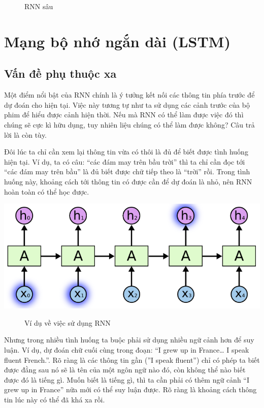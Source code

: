 \begin{itemize}
\begin{center}
\begin{figure}[htp]
\begin{center}
    \end{center}
    \caption{RNN sâu}
    \end{figure}
    \end{center}
\end{itemize}


\section{Mạng bộ nhớ ngắn dài (LSTM)}
\subsection{Vấn đề phụ thuộc xa}
Một điểm nổi bật của RNN chính là ý tưởng kết nối các thông tin phía trước để dự đoán cho hiện tại. Việc này tương tự như ta sử dụng các cảnh trước của bộ phim để hiểu được cảnh hiện thời. Nếu mà RNN có thể làm được việc đó thì chúng sẽ cực kì hữu dụng, tuy nhiên liệu chúng có thể làm được không? Câu trả lời là còn tùy.\par
Đôi lúc ta chỉ cần xem lại thông tin vừa có thôi là đủ để biết được tình huống hiện tại. Ví dụ, ta có câu: “các đám may trên bầu trời” thì ta chỉ cần đọc tới “các đám may trên bầu” là đủ biết được chữ tiếp theo là “trời” rồi. Trong tình huống này, khoảng cách tới thông tin có được cần để dự đoán là nhỏ, nên RNN hoàn toàn có thể học được.
\begin{center}
    \includegraphics[scale=.3]{image/chapter6/ptx1.png}
    \begin{figure}[htp]
    \begin{center}
     
    \end{center}
    \caption{Ví dụ về việc sử dụng RNN}
    \end{figure}
\end{center}
Nhưng trong nhiều tình huống ta buộc phải sử dụng nhiều ngữ cảnh hơn để suy luận. Ví dụ, dự đoán chữ cuối cùng trong đoạn: “I grew up in France… I speak fluent French.”. Rõ ràng là các thông tin gần (”I speak fluent”) chỉ có phép ta biết được đằng sau nó sẽ là tên của một ngôn ngữ nào đó, còn không thể nào biết được đó là tiếng gì. Muốn biết là tiếng gì, thì ta cần phải có thêm ngữ cảnh “I grew up in France” nữa mới có thể suy luận được. Rõ ràng là khoảng cách thông tin lúc này có thể đã khá xa rồi.\par
